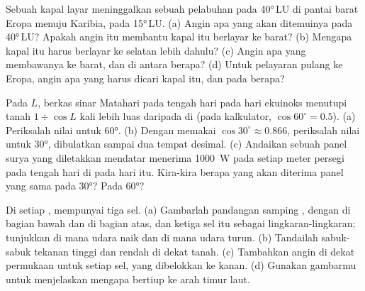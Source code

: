 \begin{exercise}[$\star\star$]\label{exo:g8:winds-global-circulation:10}
Sebuah kapal layar meninggalkan sebuah pelabuhan pada \ang{40}\,LU di
pantai barat Eropa menuju Karibia, pada \ang{15}\,LU. (a) Angin apa yang
akan ditemuinya pada \ang{40}\,LU? Apakah angin itu membantu kapal itu
berlayar ke barat? (b) Mengapa kapal itu harus berlayar ke selatan lebih
dahulu? (c) Angin apa yang membawanya ke barat, dan di antara 
berapa? (d) Untuk pelayaran pulang ke Eropa, angin apa yang harus dicari
kapal itu, dan pada  berapa?
\end{exercise}

\begin{exercise}[$\star\star\star$]\label{exo:g8:winds-global-circulation:11}
Pada  $L$, berkas sinar Matahari pada tengah hari pada hari
ekuinoks menutupi tanah $1 \div
\cos L$ kali lebih luas daripada di  (pada kalkulator,
$\cos 60^\circ = 0.5$). (a) Periksalah nilai untuk \ang{60}. (b) Dengan
memakai $\cos 30^\circ \approx 0.866$, periksalah nilai untuk \ang{30},
dibulatkan sampai dua tempat desimal. (c) Andaikan sebuah panel surya yang
diletakkan mendatar menerima \qty{1000}{W} pada setiap meter persegi pada
tengah hari di  pada hari itu. Kira-kira berapa yang akan
diterima panel yang sama pada \ang{30}? Pada \ang{60}?
\end{exercise}

\begin{exercise}[$\star\star\star$]\label{exo:g8:winds-global-circulation:12}
Di setiap ,  mempunyai tiga sel. (a) Gambarlah
pandangan samping , dengan  di bagian bawah
dan  di bagian atas, dan ketiga sel itu sebagai lingkaran-lingkaran;
tunjukkan di mana udara naik dan di mana udara turun. (b) Tandailah
sabuk-sabuk tekanan tinggi dan rendah di dekat tanah. (c) Tambahkan angin
di dekat permukaan untuk setiap sel, yang dibelokkan ke kanan.
(d) Gunakan gambarmu untuk menjelaskan mengapa  bertiup ke
arah timur laut.
\end{exercise}

